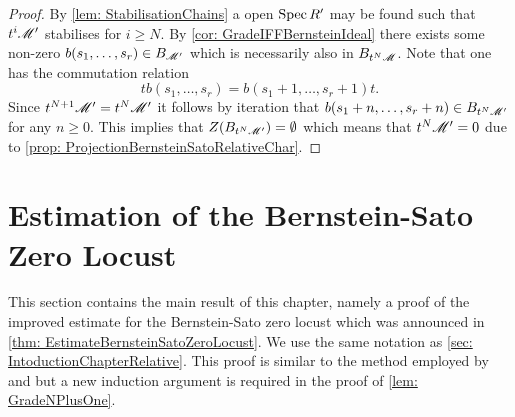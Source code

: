 \begin{proof}
  By \cref{lem: StabilisationChains} a open $\operatorname{Spec} R'$ may be found such that $t^i \mathscr{M}'$ stabilises for $i\geq N$.
  By \cref{cor: GradeIFFBernsteinIdeal} there exists some non-zero $b(s_1,\ldots,s_r) \in B_{\mathscr{M}'}$ which is necessarily also in $B_{t^N\mathscr{M}}$.
  Note that one has the commutation relation
  $$tb(s_1,\ldots,s_r) = b(s_1+1,\ldots, s_r + 1)t.$$
  Since $t^{N+1}\mathscr{M}' = t^N\mathscr{M}'$ it follows by iteration that $b(s_1+n,\ldots, s_r + n)\in B_{t^N \mathscr{M}'}$ for any $n\geq 0$.
  This implies that $Z(B_{t^N\mathscr{M}'}) = \emptyset$ which means that $t^N\mathscr{M}' = 0$ due to \cref{prop: ProjectionBernsteinSatoRelativeChar}.
\end{proof}
\section{Estimation of the Bernstein-Sato Zero Locust}
This section contains the main result of this chapter, namely a proof of the improved estimate for the Bernstein-Sato zero locust which was announced in \cref{thm: EstimateBernsteinSatoZeroLocust}.
We use the same notation as \cref{sec: IntoductionChapterRelative}.
This proof is similar to the method employed by \cite{lichtin1989poles} and \cite{kashiwara1976b} but a new induction argument is required in the proof of \cref{lem: GradeNPlusOne}.\\

